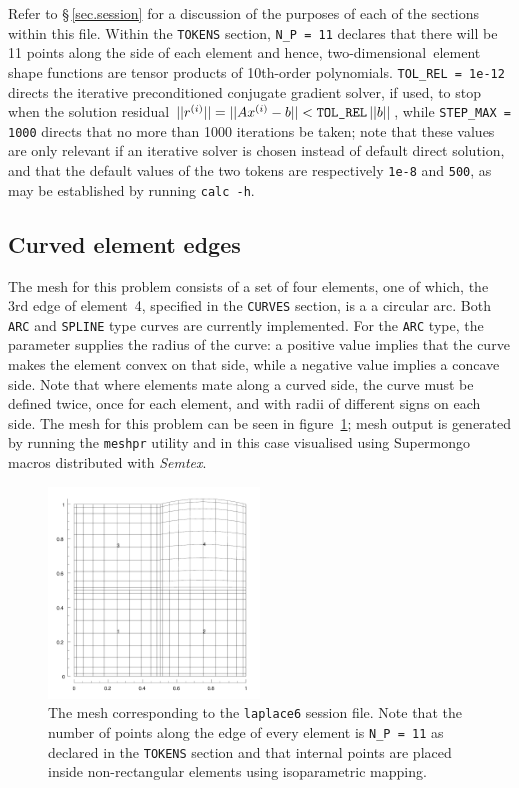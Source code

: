 \documentclass[11pt]{report}
\newcommand{\Semtex}{\emph{Semtex}} \newcommand{\Dog}{\emph{Dog}}
\newcommand\twod{two-di\-men\-sion\-al}
\begin{document}
Refer to \S\,\ref{sec.session} for a discussion of the purposes of
each of the sections within this file.  Within the \verb|TOKENS|
section, \verb|N_P = 11| declares that there will be 11 points along
the side of each element and hence, \twod\ element shape functions are
tensor products of 10th-order polynomials.  \verb|TOL_REL = 1e-12|
directs the iterative preconditioned conjugate gradient solver, if
used, to stop when the solution residual $||r^{(i)}|| = ||A x^{(i)} -
b|| < \verb|TOL_REL|\,||b||$, while \verb|STEP_MAX = 1000| directs
that no more than 1000 iterations be taken; note that these values are
only relevant if an iterative solver is chosen instead of default
direct solution, and that the default values of the two tokens are
respectively \verb|1e-8| and \verb|500|, as may be established by
running \verb|calc -h|.

\subsection{Curved element edges}
\label{sec.curves}

The mesh for this problem consists of a set of four elements, one of
which, the 3rd edge of element~4, specified in the \texttt{CURVES}
section, is a a circular arc.  Both \texttt{ARC} and \texttt{SPLINE}
type curves are currently implemented.  For the \texttt{ARC} type, the
parameter supplies the radius of the curve: a positive value implies
that the curve makes the element convex on that side, while a negative
value implies a concave side.  Note that where elements mate along a
curved side, the curve must be defined twice, once for each element,
and with radii of different signs on each side.  The mesh for this
problem can be seen in figure~\ref{lapcurve}; mesh output is generated
by running the \verb|meshpr| utility and in this case visualised using
Supermongo macros distributed with \Semtex.

\begin{figure}
\begin{center}
\includegraphics[width=0.5\textwidth]{laplace6mesh}
\end{center}
\caption{
\label{lapcurve}
  The mesh corresponding to the \texttt{laplace6} session file.  Note
  that the number of points along the edge of every element is
  \texttt{N\_P = 11} as declared in the \texttt{TOKENS} section and
  that internal points are placed inside non-rectangular elements
  using isoparametric mapping. }
\end{figure}
\end{document}
